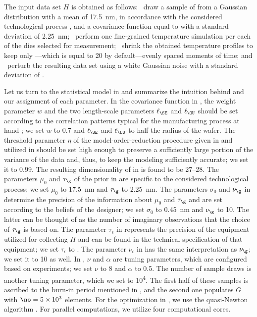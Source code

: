 The input data set $H$ is obtained as follows: \one~draw a sample of \g from a
Gaussian distribution with a mean of 17.5~nm, in accordance with the considered
technological process \cite{ptm}, and a covariance function equal to
 with a standard deviation of 2.25~nm; \two~perform
one fine-grained temperature simulation per each of the \hnd dies selected for
measurement; \three~shrink the obtained temperature profiles to keep only
\ns---which is equal to 20 by default---evenly spaced moments of time; and
\four~perturb the resulting data set using a white Gaussian noise with a
standard deviation of .

Let us turn to the statistical model in  and
summarize the intuition behind and our assignment of each parameter. In the
covariance function in , the weight parameter $w$ and
the two length-scale parameters $\ell_\SE$ and $\ell_\OU$ should be set
according to the correlation patterns typical for the manufacturing process at
hand \cite{chandrakasan2000, cheng2011}; we set $w$ to 0.7 and $\ell_\SE$ and
$\ell_\OU$ to half the radius of the wafer. The threshold parameter $\eta$ of
the model-order-reduction procedure given in  and utilized
in  should be set high enough to preserve a
sufficiently large portion of the variance of the data and, thus, to keep the
modeling sufficiently accurate; we set it to 0.99. The resulting dimensionality
\nz of \vz in  is found to be 27--28. The parameters
$\mu_0$ and $\tau_\g$ of the prior in  are specific to the
considered technological process; we set $\mu_0$ to 17.5~nm and $\tau_\g$ to
2.25~nm. The parameters $\sigma_0$ and $\nu_\g$ in 
determine the precision of the information about $\mu_0$ and $\tau_\g$ and are
set according to the beliefs of the designer; we set $\sigma_0$ to 0.45~nm and
$\nu_\g$ to 10. The latter can be thought of as the number of imaginary
observations that the choice of $\tau_\g$ is based on. The parameter
$\tau_\epsilon$ in  represents the precision of the
equipment utilized for collecting $H$ and can be found in the technical
specification of that equipment; we set $\tau_\epsilon$ to . The
parameter $\nu_\epsilon$ in  has the same interpretation
as $\nu_\g$; we set it to 10 as well. In , $\nu$ and
$\alpha$ are tuning parameters, which are configured based on experiments; we
set $\nu$ to 8 and $\alpha$ to 0.5. The number of sample draws is another tuning
parameter, which we set to 10\textsuperscript{4}. The first half of these
samples is ascribed to the burn-in period mentioned in
, and the second one populates $G$ with $\no = 5
\times 10^3$ elements. For the optimization in , we
use the quasi-Newton algorithm \cite{press2007}. For parallel computations, we
utilize four computational cores.

